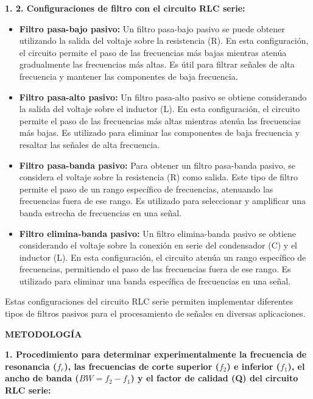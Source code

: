 \documentclass[12pt]{article}
\begin{document}
    \textbf{1. 2. Configuraciones de filtro con el circuito RLC serie:}

    \begin{itemize}
        \item \textbf{Filtro pasa-bajo pasivo:} Un filtro pasa-bajo pasivo se puede obtener utilizando la salida del voltaje sobre la resistencia (R). En esta configuración, el circuito permite el paso de las frecuencias más bajas mientras atenúa gradualmente las frecuencias más altas. Es útil para filtrar señales de alta frecuencia y mantener las componentes de baja frecuencia.
    
        \item \textbf{Filtro pasa-alto pasivo:} Un filtro pasa-alto pasivo se obtiene considerando la salida del voltaje sobre el inductor (L). En esta configuración, el circuito permite el paso de las frecuencias más altas mientras atenúa las frecuencias más bajas. Es utilizado para eliminar las componentes de baja frecuencia y resaltar las señales de alta frecuencia.
    
        \item \textbf{Filtro pasa-banda pasivo:} Para obtener un filtro pasa-banda pasivo, se considera el voltaje sobre la resistencia (R) como salida. Este tipo de filtro permite el paso de un rango específico de frecuencias, atenuando las frecuencias fuera de ese rango. Es utilizado para seleccionar y amplificar una banda estrecha de frecuencias en una señal.
    
        \item \textbf{Filtro elimina-banda pasivo:} Un filtro elimina-banda pasivo se obtiene considerando el voltaje sobre la conexión en serie del condensador (C) y el inductor (L). En esta configuración, el circuito atenúa un rango específico de frecuencias, permitiendo el paso de las frecuencias fuera de ese rango. Es utilizado para eliminar una banda específica de frecuencias en una señal.
    \end{itemize}
    
    Estas configuraciones del circuito RLC serie permiten implementar diferentes tipos de filtros pasivos para el procesamiento de señales en diversas aplicaciones.
    
    \newpage
    
    \begin{center}
        \textbf{\large METODOLOGÍA}\\
    \end{center}
    
    \textbf{1. Procedimiento para determinar experimentalmente la frecuencia de resonancia ($f_{r}$), las frecuencias de corte superior ($f_{2}$) e inferior ($f_{1}$), el ancho de banda ($BW = f_{2}-f_{1}$) y el factor de calidad (Q) del circuito RLC serie:}
\end{document}
